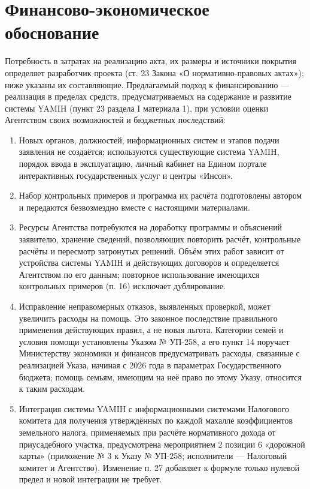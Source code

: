 \documentclass[14pt,a4paper]{extarticle}
\begin{document}
\section{Финансово-экономическое обоснование}\label{sec:fin}
Потребность в затратах на реализацию акта, их размеры и источники покрытия определяет разработчик проекта (ст. 23 Закона «О нормативно-правовых актах»\cite{orq682}); ниже указаны их составляющие. Предлагаемый подход к финансированию — реализация в пределах средств, предусматриваемых на содержание и развитие системы YAMIH (пункт 23 раздела I материала 1), при условии оценки Агентством своих возможностей и бюджетных последствий:
\begin{enumerate}[leftmargin=1.27cm]
\item Новых органов, должностей, информационных систем и этапов подачи заявления не создаётся; используются существующие система YAMIH, порядок ввода в эксплуатацию, личный кабинет на Едином портале интерактивных государственных услуг и центры «Инсон».
\item Набор контрольных примеров и программа их расчёта подготовлены автором и передаются безвозмездно вместе с настоящими материалами.
\item Ресурсы Агентства потребуются на доработку программы и объяснений заявителю, хранение сведений, позволяющих повторить расчёт, контрольные расчёты и пересмотр затронутых решений. Объём этих работ зависит от устройства системы YAMIH и действующих договоров и определяется Агентством по его данным; повторное использование имеющихся контрольных примеров (п. 16) исключает дублирование.
\item Исправление неправомерных отказов, выявленных проверкой, может увеличить расходы на помощь. Это законное последствие правильного применения действующих правил, а не новая льгота. Категории семей и условия помощи установлены Указом № УП-258, а его пункт 14 поручает Министерству экономики и финансов предусматривать расходы, связанные с реализацией Указа, начиная с 2026 года в параметрах Государственного бюджета\cite{pf258}; помощь семьям, имеющим на неё право по этому Указу, относится к таким расходам.
\item Интеграция системы YAMIH с информационными системами Налогового комитета для получения утверждённых по каждой махалле коэффициентов земельного налога, применяемых при расчёте нормативного дохода от приусадебного участка, предусмотрена мероприятием 2 позиции 6 «дорожной карты» (приложение № 3 к Указу № УП-258; исполнители — Налоговый комитет и Агентство)\cite{pf258}. Изменение п. 27 добавляет к формуле только нулевой предел и новой интеграции не требует.

\end{enumerate}
\end{document}
